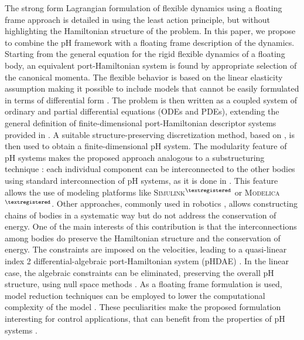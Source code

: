 \documentclass{svjour3}                     %
\newcommand{\firstRev}[1]{\textcolor{red!80!black}{#1}}
\begin{document}
	\indent \firstRev{The strong form Lagrangian formulation of flexible dynamics using a floating frame approach is detailed in  \cite[Eq. 4.10]{simeon2013computational} using the least action principle, but without highlighting the Hamiltonian structure of the problem.} In this paper, we propose to combine the pH framework with a floating frame description of the dynamics. Starting from the general equation for the rigid flexible dynamics of a floating body, an equivalent port-Hamiltonian system is found by appropriate selection of the canonical momenta. The flexible behavior is based on the linear elasticity assumption making it possible to include models that cannot be easily formulated in terms of differential form  \cite{BRUGNOLI2019940,BRUGNOLI2019961}. The problem is then written as a coupled system of ordinary and partial differential equations (ODEs and PDEs), extending the general definition of finite-dimensional port-Hamiltonian descriptor systems provided in \cite{mehrmann2019structurepreserving}. A suitable structure-preserving discretization method, based on \cite{cardoso2019partitioned}, is then used to obtain a finite-dimensional pH system. The modularity feature of pH systems makes the proposed approach analogous to a substructuring technique \cite{substructuring}: each individual component can be interconnected to the other bodies using standard interconnection of pH systems, as it is done in \cite{macchelli_flrig}. This feature allows the use of modeling platforms like \textsc{Simulink}$^{\tiny{\textregistered}}$ or \textsc{Modelica}$^{\tiny{\textregistered}}$. \firstRev{Other approaches, commonly used in robotics \cite[Chapter 5]{bremer2008elastic}, allows constructing chains of bodies in a systematic way but do not address the conservation of energy. One of the main interests of this contribution is that the interconnections among bodies do preserve the Hamiltonian structure and the conservation of energy.} The constraints are imposed on the velocities, leading to a quasi-linear index 2 differential-algebraic port-Hamiltonian system (pHDAE) \cite{phd_steinbrecher,beattie2018linear}. In the linear case, the algebraic constraints can be eliminated, preserving the overall pH structure, using null space methods \cite{nullspaceFlMult}.  As a floating frame formulation is used, model reduction techniques can be employed to lower the computational complexity of the model \cite{phode_red,phdae_red}. These peculiarities make the proposed formulation interesting for control applications, that can benefit from the properties of pH systems \cite{PHadaptive,ORTEGAsurvey}.  \\
\end{document}
